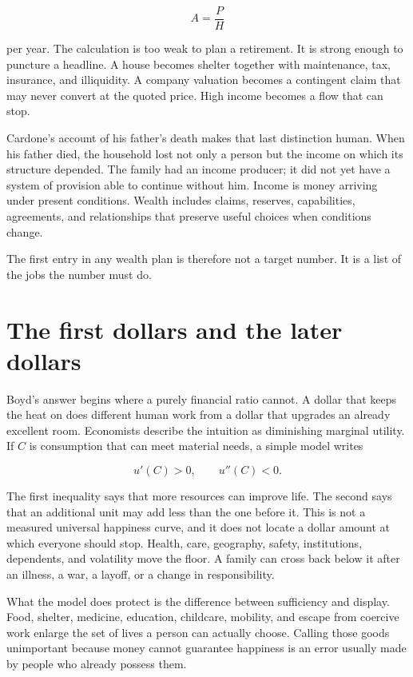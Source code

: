 \begin{equation}
A=\frac{P}{H}
\end{equation}

per year. The calculation is too weak to plan a retirement. It is strong enough
to puncture a headline. A house becomes shelter together with maintenance,
tax, insurance, and illiquidity. A company valuation becomes a contingent
claim that may never convert at the quoted price. High income becomes a flow
that can stop.

Cardone's account of his father's death makes that last distinction human.
When his father died, the household lost not only a person but the income on
which its structure depended. The family had an income producer; it did not
yet have a system of provision able to continue without him. Income is money
arriving under present conditions. Wealth includes claims, reserves,
capabilities, agreements, and relationships that preserve useful choices when
conditions change.

The first entry in any wealth plan is therefore not a target number. It is a
list of the jobs the number must do.

\section{The first dollars and the later dollars}

Boyd's answer begins where a purely financial ratio cannot. A dollar that keeps
the heat on does different human work from a dollar that upgrades an already
excellent room. Economists describe the intuition as diminishing marginal
utility. If $C$ is consumption that can meet material needs, a simple model
writes

\begin{equation}
u'(C)>0,\qquad u''(C)<0.
\end{equation}

The first inequality says that more resources can improve life. The second
says that an additional unit may add less than the one before it. This is not
a measured universal happiness curve, and it does not locate a dollar amount
at which everyone should stop. Health, care, geography, safety, institutions,
dependents, and volatility move the floor. A family can cross back below it
after an illness, a war, a layoff, or a change in responsibility.

What the model does protect is the difference between sufficiency and display.
Food, shelter, medicine, education, childcare, mobility, and escape from
coercive work enlarge the set of lives a person can actually choose. Calling
those goods unimportant because money cannot guarantee happiness is an error
usually made by people who already possess them.

